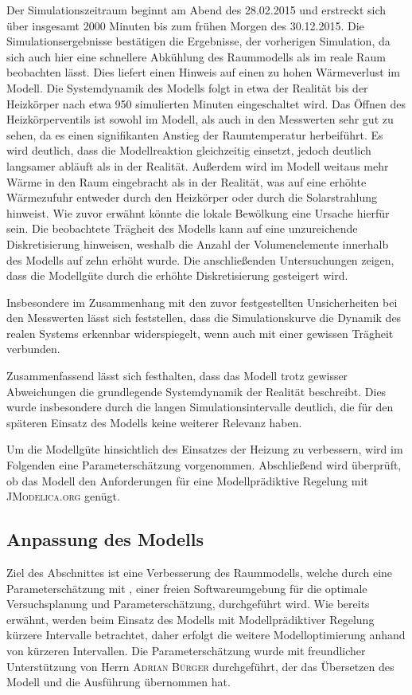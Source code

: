 Der Simulationszeitraum beginnt am Abend des 28.02.2015 und erstreckt sich über insgesamt 2000 Minuten bis zum frühen Morgen des 30.12.2015. Die Simulationsergebnisse bestätigen die Ergebnisse, der vorherigen Simulation, da sich auch hier eine schnellere Abkühlung des Raummodells als im reale Raum beobachten lässt. Dies liefert einen Hinweis auf einen zu hohen Wärmeverlust im Modell.
Die Systemdynamik des Modells folgt in etwa der Realität bis der Heizkörper nach etwa 950 simulierten Minuten eingeschaltet wird. 
Das Öffnen des Heizkörperventils ist sowohl im Modell, als auch in den Messwerten sehr gut zu sehen, da es einen signifikanten Anstieg der Raumtemperatur herbeiführt. Es wird deutlich, dass die Modellreaktion gleichzeitig einsetzt, jedoch deutlich langsamer abläuft als in der Realität. Außerdem wird im Modell weitaus mehr Wärme in den Raum eingebracht als in der Realität, was auf eine erhöhte Wärmezufuhr entweder durch den Heizkörper oder durch die Solarstrahlung hinweist. Wie zuvor erwähnt könnte die lokale Bewölkung eine Ursache hierfür sein.
Die beobachtete Trägheit des Modells kann auf eine unzureichende Diskretisierung hinweisen, weshalb die Anzahl der Volumenelemente innerhalb des Modells auf zehn erhöht wurde. Die anschließenden Untersuchungen zeigen, dass die Modellgüte durch die erhöhte Diskretisierung gesteigert wird.

Insbesondere im Zusammenhang mit den zuvor festgestellten Unsicherheiten bei den Messwerten lässt sich feststellen, dass die Simulationskurve die Dynamik des realen Systems erkennbar widerspiegelt, wenn auch mit einer gewissen Trägheit verbunden.

Zusammenfassend lässt sich festhalten, dass das Modell trotz gewisser Abweichungen die grundlegende Systemdynamik der Realität beschreibt. Dies wurde insbesondere durch die langen Simulationsintervalle deutlich, die für den späteren Einsatz des Modells keine weiterer Relevanz haben.

Um die Modellgüte hinsichtlich des Einsatzes der Heizung zu verbessern, wird im Folgenden eine Parameterschätzung vorgenommen. Abschließend wird überprüft, ob das Modell den Anforderungen für eine Modellprädiktive Regelung mit \textsc{JModelica.org} genügt.


\subsection{Anpassung des Modells}

Ziel des Abschnittes ist eine Verbesserung des Raummodells, welche durch eine Parameterschätzung mit \cite{casiopeia}, einer freien Softwareumgebung für die optimale Versuchsplanung und Parameterschätzung, durchgeführt wird.
Wie bereits erwähnt, werden beim Einsatz des Modells mit Modellprädiktiver Regelung kürzere Intervalle betrachtet, daher erfolgt die weitere Modelloptimierung anhand von kürzeren Intervallen. Die Parameterschätzung wurde mit freundlicher Unterstützung von Herrn \textsc{Adrian Bürger} durchgeführt, der das Übersetzen des Modell und die Ausführung übernommen hat.

